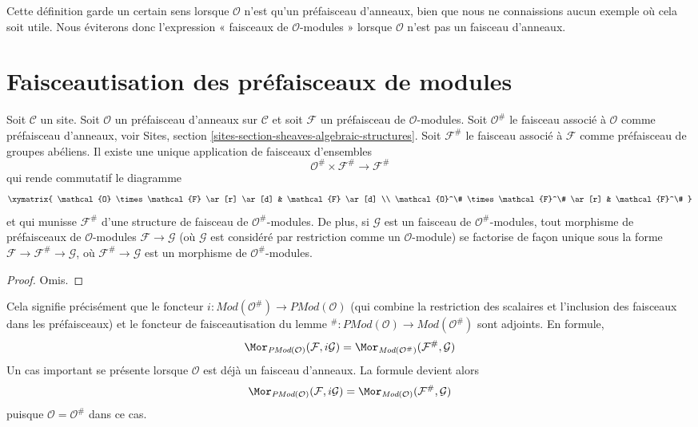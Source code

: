 \noindent
Cette définition garde un certain sens lorsque $\mathcal{O}$ n'est qu'un
préfaisceau d'anneaux, bien que nous ne connaissions aucun exemple où cela soit
utile. Nous éviterons donc l'expression « faisceaux de $\mathcal{O}$-modules »
lorsque $\mathcal{O}$ n'est pas un faisceau d'anneaux.



\section{Faisceautisation des préfaisceaux de modules}
\label{section-sheafification-presheaves-modules}

\begin{lemma}
\label{lemma-sheafification-presheaf-modules}
Soit $\mathcal{C}$ un site. Soit $\mathcal{O}$ un préfaisceau d'anneaux sur
$\mathcal{C}$ et soit $\mathcal{F}$ un préfaisceau de $\mathcal{O}$-modules.
Soit $\mathcal{O}^\#$ le faisceau associé à $\mathcal{O}$ comme préfaisceau
d'anneaux, voir Sites, section
\ref{sites-section-sheaves-algebraic-structures}. Soit $\mathcal{F}^\#$ le
faisceau associé à $\mathcal{F}$ comme préfaisceau de groupes abéliens. Il
existe une unique application de faisceaux d'ensembles
$$
\mathcal{O}^\# \times \mathcal{F}^\#
\longrightarrow
\mathcal{F}^\#
$$
qui rende commutatif le diagramme
$$
\xymatrix{
\mathcal{O} \times \mathcal{F} \ar[r] \ar[d] &
\mathcal{F} \ar[d] \\
\mathcal{O}^\# \times \mathcal{F}^\# \ar[r] &
\mathcal{F}^\#
}
$$
et qui munisse $\mathcal{F}^\#$ d'une structure de faisceau de
$\mathcal{O}^\#$-modules. De plus, si $\mathcal{G}$ est un faisceau de
$\mathcal{O}^\#$-modules, tout morphisme de préfaisceaux de
$\mathcal{O}$-modules $\mathcal{F} \to \mathcal{G}$ (où $\mathcal{G}$ est
considéré par restriction comme un $\mathcal{O}$-module) se factorise de façon
unique sous la forme $\mathcal{F} \to \mathcal{F}^\# \to \mathcal{G}$, où
$\mathcal{F}^\# \to \mathcal{G}$ est un morphisme de
$\mathcal{O}^\#$-modules.
\end{lemma}

\begin{proof}
Omis.
\end{proof}

\noindent
Cela signifie précisément que le foncteur
$i : \textit{Mod}(\mathcal{O}^\#) \to \textit{PMod}(\mathcal{O})$
(qui combine la restriction des scalaires et l'inclusion des faisceaux dans
les préfaisceaux) et le foncteur de faisceautisation du lemme
${}^\# : \textit{PMod}(\mathcal{O}) \to \textit{Mod}(\mathcal{O}^\#)$
sont adjoints. En formule,
$$
\Mor_{\textit{PMod}(\mathcal{O})}(\mathcal{F}, i\mathcal{G})
=
\Mor_{\textit{Mod}(\mathcal{O}^\#)}(\mathcal{F}^\#, \mathcal{G})
$$
Un cas important se présente lorsque $\mathcal{O}$ est déjà un faisceau
d'anneaux. La formule devient alors
$$
\Mor_{\textit{PMod}(\mathcal{O})}(\mathcal{F}, i\mathcal{G})
=
\Mor_{\textit{Mod}(\mathcal{O})}(\mathcal{F}^\#, \mathcal{G})
$$
puisque $\mathcal{O} = \mathcal{O}^\#$ dans ce cas.

